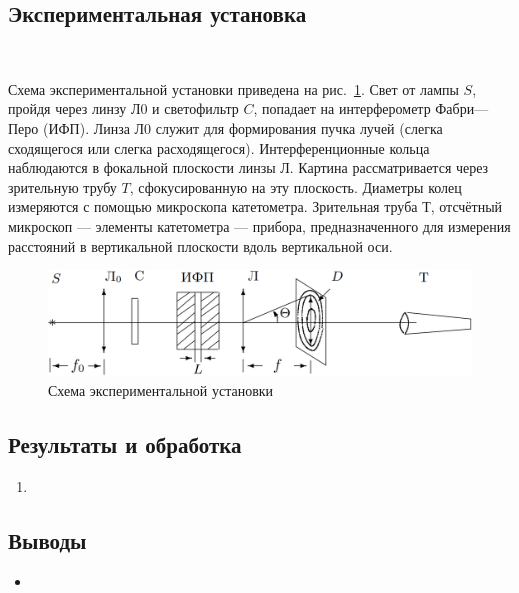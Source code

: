 \documentclass[12pt]{article}
\begin{document}
    \subsection*{Экспериментальная установка}
    \ \par
    Схема экспериментальной установки приведена на рис.\ \ref{fig:fig2}.
    Свет от лампы $S$, пройдя через линзу $\text{Л}0$ и светофильтр $C$, попадает на интерферометр Фабри—Перо (ИФП).
    Линза $\text{Л}0$ служит для формирования пучка лучей (слегка сходящегося или слегка расходящегося).
    Интерференционные кольца наблюдаются в фокальной плоскости линзы $Л$.
    Картина рассматривается через зрительную трубу $T$, сфокусированную на эту плоскость.
    Диаметры колец измеряются с помощью микроскопа катетометра.
    Зрительная труба $Т$, отсчётный микроскоп — элементы катетометра — прибора,
    предназначенного для измерения расстояний в вертикальной плоскости вдоль вертикальной оси.


    \begin{figure}[h]
        \centering
        \includegraphics[width=\linewidth]{pic/setup}
        \caption{Схема экспериментальной установки}
        \label{fig:fig2}
    \end{figure}



    \subsection*{Результаты и обработка}
    \begin{enumerate}
        \item
    \end{enumerate}

    \subsection*{Выводы}
    \begin{itemize}
        \item
    \end{itemize}
\end{document}
